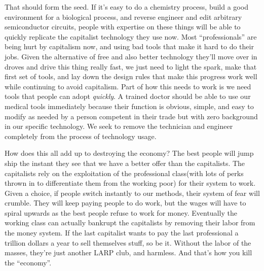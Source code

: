 That should form the seed. If it's easy to do a chemistry process, build
a good environment for a biological process, and reverse engineer and
edit arbitrary semiconductor circuits, people with expertise on these
things will be able to quickly replicate the capitalist technology they
use now. Most ``professionals'' are being hurt by capitalism now, and
using bad tools that make it hard to do their jobs. Given the
alternative of free and also better technology they'll move over in
droves and drive this thing really fast, we just need to light the
spark, make that first set of tools, and lay down the design rules that
make this progress work well while continuing to avoid capitalism. Part
of how this needs to work is we need tools that people can adopt
\emph{quickly}. A trained doctor should be able to use our medical tools
immediately because their function is obvious, simple, and easy to
modify as needed by a person competent in their trade but with zero
background in our specific technology. We seek to remove the technician
and engineer completely from the process of technology usage.

How does this all add up to destroying the economy? The best people will
jump ship the instant they see that we have a better offer than the
capitalists. The capitalists rely on the exploitation of the
professional class(with lots of perks thrown in to differentiate them
from the working poor) for their system to work. Given a choice, if
people switch instantly to our methods, their system of fear will
crumble. They will keep paying people to do work, but the wages will
have to spiral upwards as the best people refuse to work for money.
Eventually the working class can actually bankrupt the capitalists by
removing their labor from the money system. If the last capitalist wants
to pay the last professional a trillion dollars a year to sell
themselves stuff, so be it. Without the labor of the masses, they're
just another LARP club, and harmless. And that's how you kill the
``economy''.
